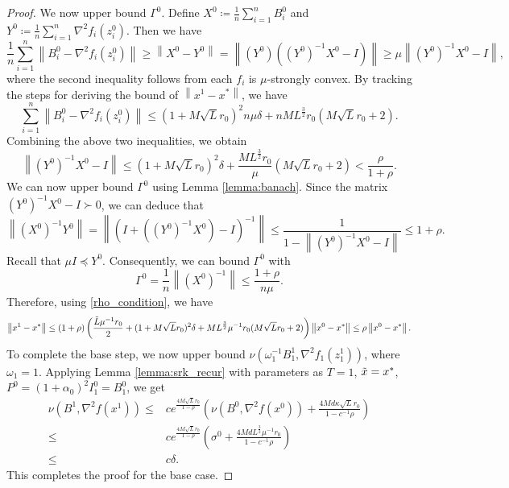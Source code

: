 \documentclass[letterpaper]{article} %
\theoremstyle{plain}
\theoremstyle{definition}
\theoremstyle{remark}
\newcommand\norm[1]{\left\lVert#1\right\rVert}
\begin{document}
\begin{proof}
    We now upper bound $\Gamma^0$. Define $X^0 \coloneqq \frac{1}{n} \sum_{i=1}^n B_i^0$ and $Y^0 \coloneqq \frac{1}{n} \sum_{i=1}^n \nabla^2 f_i (z_i^0)$. Then we have
    \begin{equation*}
        \frac{1}{n} \sum_{i=1}^n \norm{B_i^0 - \nabla^2 f_i (z_i^0)} \geq \norm{X^0 - Y^0} = \norm{(Y^0)((Y^0)^{-1} X^0 - I)} \geq \mu \norm{(Y^0)^{-1} X^0 - I},
    \end{equation*}
    where the second inequality follows from each $f_i$ is $\mu$-strongly convex. By tracking the steps for deriving the bound of $\norm{x^1 - x^*}$, we have
    \begin{equation*}
        \sum_{i=1}^n \norm{B_i^0 - \nabla^2 f_i (z_i^0)} \leq (1 + M \sqrt{L} r_0)^2 n \mu \delta + n M L^{\frac{3}{2}} r_0 (M \sqrt{L} r_0 + 2).
    \end{equation*}
    Combining the above two inequalities, we obtain
    \begin{equation*}
        \norm{(Y^0)^{-1} X^0 - I} \leq (1 + M \sqrt{L} r_0)^2  \delta +  \frac{M L^{\frac{3}{2}} r_0}{\mu} (M \sqrt{L} r_0 + 2) < \frac{\rho}{1 + \rho}.
    \end{equation*}
    We can now upper bound $\Gamma^0$ using Lemma \ref{lemma:banach}. Since the matrix $(Y^0)^{-1}X^0 - I \succ 0$, we can deduce that
    \begin{equation*}
        \norm{(X^0)^{-1} Y^0} = \norm{(I + ((Y^0)^{-1} X^0)- I)^{-1}} \leq \frac{1}{1 - \norm{(Y^0)^{-1} X^0 - I}} \leq 1 + \rho.
    \end{equation*}
    Recall that $\mu I \preceq Y^0$. Consequently, we can bound $\Gamma^0$ with
    \begin{equation*}
        \Gamma^0 = \frac{1}{n} \norm{(X^0)^{-1}} \leq \frac{1+\rho}{n \mu}.
    \end{equation*}
    Therefore, using \eqref{rho_condition}, we have
    \begin{equation*}
         \norm{x^1 - x^*} 
         \leq  (1 + \rho) \left(\frac{\Tilde{L} \mu^{-1} r_0}{2} + (1 + M \sqrt{L} r_0)^2  \delta +  M L^{\frac{3}{2}} \mu^{-1} r_0 (M \sqrt{L} r_0 + 2) \right) \norm{x^0 - x^*} \leq \rho \norm{x^0 - x^*}.
    \end{equation*}
    To complete the base step, we now upper bound $\nu(\omega_{1}^{-1} B_{1}^1, \nabla^2 f_{1}(z_{1}^1))$, where $\omega_1 = 1$. Applying Lemma \ref{lemma:srk_recur} with parameters as $T=1$, $\Tilde{x} = x^*$, $P^0 = (1 + \alpha_0)^2 I_1^0 = B_1^0$, we get
    \begin{align*}
          \nu(B^1, \nabla^2 f(x^1))  \leq &  c e^ {\frac{4 M \sqrt{L}  r_0}{1 - \rho} } \left( \nu (B^{0}, \nabla^2 f(x^{0})) +  \frac{4 M d \kappa \sqrt{L} r_0 }{1 - c^{-1} \rho}  \right) \\
          \leq & c e^ {\frac{4 M \sqrt{L}  r_0}{1 - \rho} } \left( \sigma^0 +  \frac{4 M d  L^{\frac{3}{2}} \mu^{-1} r_0 }{1 - c^{-1} \rho}  \right) \\
          \leq & c \delta.
    \end{align*}
    This completes the proof for the base case.
    

\end{proof}
\end{document}
